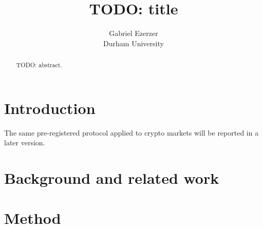 \documentclass{article}
\title{TODO: title}
\author{Gabriel Ezerzer \\
Durham University}
\begin{document}
\maketitle
{}

\begin{abstract}
TODO: abstract.
\end{abstract}

\section{Introduction}
\label{sec:intro}


The same pre-registered protocol applied to crypto markets will be reported in a later version.

\section{Background and related work}
\label{sec:background}


\section{Method}
\label{sec:method}

\end{document}
